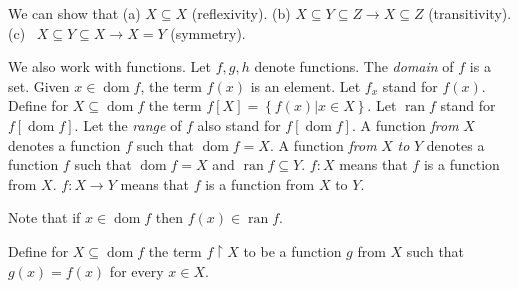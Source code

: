 \documentclass{letter}
\newcommand{\tmem}[1]{{\em #1\/}}
\newcommand{\tmop}[1]{\ensuremath{\operatorname{#1}}}
\begin{document}
We can show that (a) $X \subseteq X$ (reflexivity). (b) $X \subseteq Y
\subseteq Z \rightarrow X \subseteq Z$ (transitivity). (c) \ $X \subseteq Y
\subseteq X \rightarrow X = Y$ (symmetry).

We also work with functions. Let $f, g, h$ denote functions. The
{\tmem{domain}} of $f$ is a set. Given $x \in \tmop{dom} f$, the term $f
\left( x \right)$ is an element. Let $f_x$ stand for $f \left( x \right)$.
Define for $X \subseteq \tmop{dom} f$ the term $f \left[ X \right] = \left\{ f
\left( x \right)  \left| \right. x \in X \right\}$. Let $\tmop{ran} f$ stand
for $f \left[ \tmop{dom} f \right]$. Let the {\tmem{range}} of $f$ also stand
for $f \left[ \tmop{dom} f \right]$. A function {\tmem{from}} $X$ denotes a
function $f$ such that $\tmop{dom} f = X$. A function {\tmem{from}} $X$
{\tmem{to}} $Y$ denotes a function $f$ such that $\tmop{dom} f = X$ and
$\tmop{ran} f \subseteq Y$. $f : X$ means that $f$ is a function from $X$. $f
: X \rightarrow Y$ means that $f$ is a function from $X$ to $Y$.

Note that if $x \in \tmop{dom} f$ then $f \left( x \right) \in \tmop{ran} f$.

Define for $X \subseteq \tmop{dom} f$ the term $f \upharpoonright X$ to be a
function $g$ from $X$ such that $g \left( x \right) = f \left( x \right)$ for
every $x \in X$.
\end{document}
